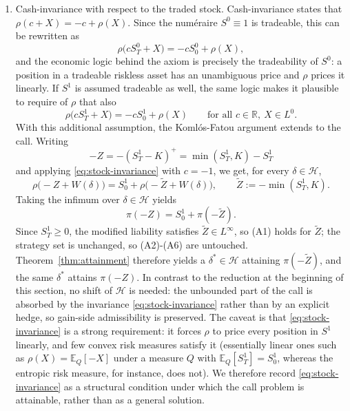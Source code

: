 \documentclass[11pt,a4paper]{report}
\numberwithin{equation}{chapter}
\theoremstyle{plain}
\theoremstyle{definition}
\newcommand{\E}{\mathbb{E}}
\newcommand{\R}{\mathbb{R}}
\newcommand{\HH}{\mathcal{H}}
\begin{document}
\begin{enumerate}[leftmargin=*,itemsep=1ex,parsep=0pt]
    \item Cash-invariance with respect to the traded stock. Cash-invariance states that $\rho(c+X)=-c+\rho(X)$. Since the num\'eraire $S^0\equiv1$ is tradeable, this can be rewritten as
          \[
              \rho\bigl(cS_T^0+X\bigr)=-cS_0^0+\rho(X),
          \]
          and the economic logic behind the axiom is precisely the tradeability of $S^0$: a position in a tradeable riskless asset has an unambiguous price and $\rho$ prices it linearly. If $S^1$ is assumed tradeable as well, the same logic makes it plausible to require of $\rho$ that also
          \begin{equation}\label{eq:stock-invariance}
              \rho\bigl(cS_T^1+X\bigr)=-cS_0^1+\rho(X)\qquad\text{for all }c\in\R,\ X\in L^0.
          \end{equation}
          With this additional assumption, the Koml\'os-Fatou argument extends to the call. Writing
          \[
              -Z=-(S_T^1-K)^+=\min(S_T^1,K)-S_T^1
          \]
          and applying \eqref{eq:stock-invariance} with $c=-1$, we get, for every $\delta\in\HH$,
          \[
              \rho\bigl(-Z+W(\delta)\bigr)=S_0^1+\rho\bigl(-\widetilde Z+W(\delta)\bigr),\qquad\widetilde Z:=-\min(S_T^1,K).
          \]
          Taking the infimum over $\delta\in\HH$ yields
          \[
              \pi(-Z)=S_0^1+\pi(-\widetilde Z).
          \]
          Since $S_T^1\ge0$, the modified liability satisfies $\widetilde Z\in L^\infty$, so (A1) holds for $\widetilde Z$; the strategy set is unchanged, so (A2)-(A6) are untouched. Theorem~\ref{thm:attainment} therefore yields a $\delta^*\in\HH$ attaining $\pi(-\widetilde Z)$, and the same $\delta^*$ attains $\pi(-Z)$. In contrast to the reduction at the beginning of this section, no shift of $\HH$ is needed: the unbounded part of the call is absorbed by the invariance \eqref{eq:stock-invariance} rather than by an explicit hedge, so gain-side admissibility is preserved. The caveat is that \eqref{eq:stock-invariance} is a strong requirement: it forces $\rho$ to price every position in $S^1$ linearly, and few convex risk measures satisfy it (essentially linear ones such as $\rho(X)=\E_Q[-X]$ under a measure $Q$ with $\E_Q[S_T^1]=S_0^1$, whereas the entropic risk measure, for instance, does not). We therefore record \eqref{eq:stock-invariance} as a structural condition under which the call problem is attainable, rather than as a general solution.
\end{enumerate}
\end{document}
